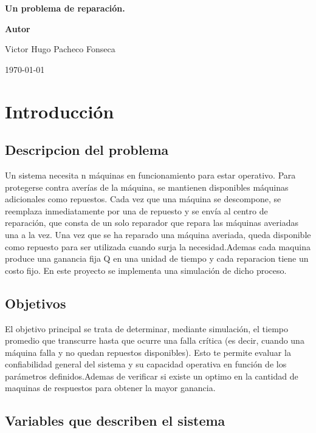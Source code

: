 \documentclass[a4paper,12pt]{article}
\begin{document}
	
	\begin{titlepage}
		\centering
		\vspace{1in}
		{\Huge \bfseries Un problema de reparación.  \par}
		\vspace{1.5in}
		\centering
		\vspace{1in}
		{\Huge \bfseries Autor \par}
		{\Large Victor Hugo Pacheco Fonseca  \par}
		
		\vfill
		{\Large \today \par}
	\end{titlepage}
	
	\tableofcontents
	\newpage
	
	\section{Introducción}
		\subsection{Descripcion del problema}
		Un sistema necesita n máquinas en funcionamiento para estar operativo. Para protegerse contra averías de la máquina, se mantienen disponibles máquinas adicionales como repuestos. Cada vez que una máquina se descompone, se reemplaza inmediatamente por una de repuesto y se envía al centro de reparación, que consta de un solo reparador que repara las máquinas averiadas una a la vez. Una vez que se ha reparado una máquina averiada, queda disponible como repuesto para ser utilizada cuando surja la necesidad.Ademas cada maquina produce una ganancia fija Q en una unidad de tiempo y cada reparacion tiene un costo fijo.
		En este proyecto se implementa una simulación de dicho proceso.
		
		\subsection{Objetivos}
		El objetivo principal se trata de determinar, mediante simulación, el tiempo promedio que transcurre hasta que ocurre una falla crítica (es decir, cuando una máquina falla y no quedan repuestos disponibles). Esto te permite evaluar la confiabilidad general del sistema y su capacidad operativa en función de los parámetros definidos.Ademas de verificar si existe un optimo en la cantidad de maquinas de respuestos para obtener la mayor ganancia.
		
		\subsection{Variables que describen el sistema}
\end{document}
